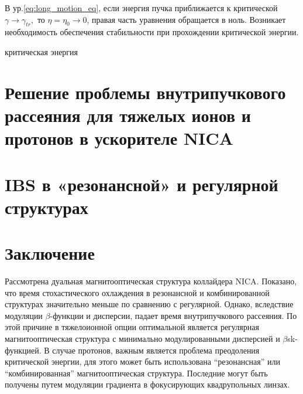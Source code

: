 \par В ур.\ref{eq:long_motion_eq}, если энергия пучка приближается к критической $\gamma\rightarrow\gamma_{tr},$  то $\eta=\eta_0\rightarrow0$, правая часть уравнения обращается в ноль. Возникает необходимость обеспечения стабильности при прохождении критической энергии.

\par критическая энергия 

\section{Решение проблемы внутрипучкового рассеяния для тяжелых ионов и протонов в ускорителе NICA }\label{sec:ions_light/IBS}

\section{IBS в «резонансной» и регулярной структурах}\label{sec:ions_light/IBS_res_reg}

\section{Заключение}

Рассмотрена дуальная магнитооптическая структура коллайдера NICA. Показано, что время стохастического охлаждения в резонансной и комбинированной структурах значительно меньше по сравнению с регулярной. Однако, вследствие модуляции $\beta$-функции и дисперсии, падает время внутрипучкового рассеяния. По этой причине в тяжелоионной опции оптимальной является регулярная магнитооптическая структура с минимально модулированными дисперсией и $\beta$sk-функцией. В случае протонов, важным является проблема преодоления критической энергии, для этого может быть использована “резонансная” или “комбинированная” магнитооптическая структура. Последние могут быть получены путем модуляции градиента в фокусирующих квадрупольных линзах.

\FloatBarrier
